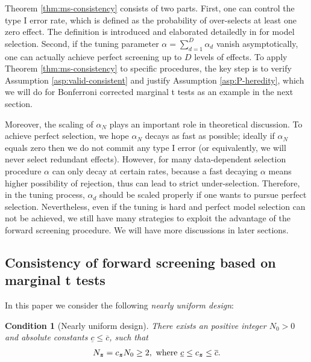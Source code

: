 \documentclass[12pt]{article}
\newtheorem{condition}{Condition}
\begin{document}
{
\color{blue}
Theorem \ref{thm:ms-consistency} consists of two parts. First, one can control the type I error rate, which is defined as the probability of over-selects at least one zero effect. The definition is introduced and elaborated detailedly in \cite{wasserman2009high} for model selection. Second, if the tuning parameter $\alpha = \sum_{d=1}^D\alpha_d$ vanish asymptotically, one can actually achieve perfect screening up to $D$ levels of effects.  To apply Theorem \ref{thm:ms-consistency} to specific procedures, the key step is to verify Assumption \ref{asp:valid-consistent} and justify Assumption \ref{asp:P-heredity}, which we will do for Bonferroni corrected marginal t tests as an example in the next section.

Moreover, the scaling of $\alpha_N$ plays an important role in theoretical discussion. To achieve perfect selection, we hope $\alpha_N$ decays as fast as possible; ideally if $\alpha_N$ equals zero then we do not commit any type I error (or equivalently, we will never select redundant effects). However, for many data-dependent selection procedure $\alpha$ can only decay at certain rates, because a fast decaying $\alpha$ means higher possibility of rejection, thus can lead to strict under-selection. Therefore, in the tuning process, $\alpha_d$ should be scaled properly if one wants to pursue perfect selection. Nevertheless, even if the tuning is hard and perfect model selection can not be achieved, we still have many strategies to exploit the advantage of the forward screening procedure. We will have more discussions in later sections.
}



\subsection{Consistency of forward screening based on marginal t tests}

In this paper we consider the following \textit{nearly uniform design}:
\begin{condition}[Nearly uniform design]\label{cond:uniform-design} There exists an positive integer $N_0 > 0$ and absolute constants $\underline{c} \le \overline{c}$, such that 
\begin{align*}
    N_{\boldsymbol{z}} = c_{\boldsymbol{z}}  {N}_0 \ge 2,  \text{ where } \underline{c}\le c_{\boldsymbol{z}}\le \overline{c}.
\end{align*}
\end{condition}
\end{document}
